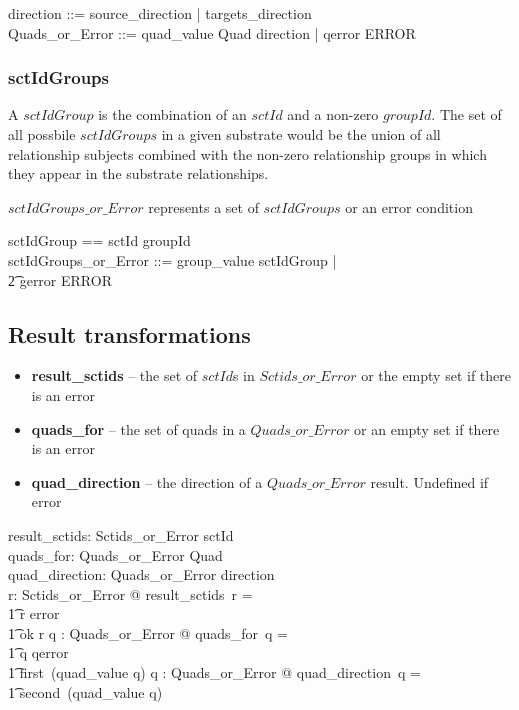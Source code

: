 \documentclass{article}
\begin{document}
\begin{zed}
direction ::= source\_direction | targets\_direction \\
Quads\_or\_Error ::= quad\_value \ldata \power Quad \cross direction \rdata | qerror \ldata ERROR \rdata
\end{zed}

\subsubsection{sctIdGroups}
A $sctIdGroup$ is the combination of an $sctId$ and a non-zero $groupId$.  The set of all possbile $sctIdGroups$ in a given substrate would be the union of all relationship
subjects combined with the non-zero relationship groups in which they appear in the substrate relationships.

$sctIdGroups\_or\_Error$ represents a set of $sctIdGroups$ or an error condition

\begin{zed}
sctIdGroup == sctId \cross groupId \\
sctIdGroups\_or\_Error ::= group\_value \ldata \power sctIdGroup \rdata | \\
\t2 gerror \ldata ERROR \rdata
\end{zed}

\subsection{Result transformations}
\begin{itemize}[noitemsep,nolistsep]
\item \textbf{result\_sctids} -- the set of $sctId$s in $Sctids\_or\_Error$ or the empty set if there is an error
\item \textbf{quads\_for} -- the set of quads in a $Quads\_or\_Error$ or an empty set if there is an error
\item \textbf{quad\_direction} -- the direction of a $Quads\_or\_Error$ result.  Undefined if error
\end{itemize}
\begin{gendef}
   result\_sctids: Sctids\_or\_Error \fun \power sctId \\
   quads\_for: Quads\_or\_Error \fun \power Quad  \\
   quad\_direction: Quads\_or\_Error \pfun direction \\
\where
   \forall r: Sctids\_or\_Error @ result\_sctids~r = \\
\t1 \IF r \in \ran error \THEN \emptyset \\
\t1 \ELSE ok \inv r
\also
   \forall q : Quads\_or\_Error @ quads\_for~q = \\
\t1 \IF q \in \ran qerror  \THEN \emptyset \\
\t1 \ELSE first~(quad\_value \inv q)
\also
   \forall q : Quads\_or\_Error @ quad\_direction~q = \\
\t1 second~(quad\_value \inv q)
\end{gendef}
\end{document}

